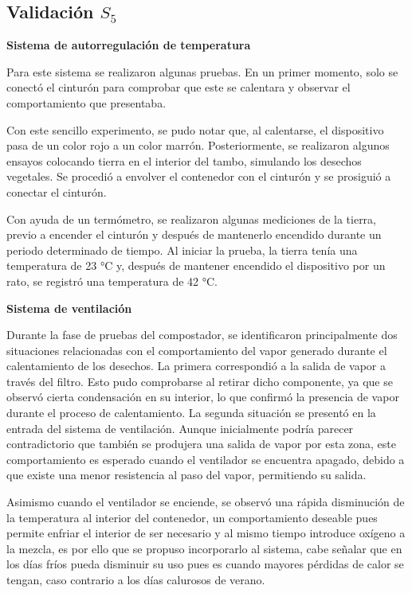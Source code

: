 \subsection{Validación  $S_5$}

\textbf{Sistema de autorregulación de temperatura
}

Para este sistema se realizaron algunas pruebas. En un primer momento, solo se conectó el cinturón para comprobar que este se calentara y observar el comportamiento que presentaba.

Con este sencillo experimento, se pudo notar que, al calentarse, el dispositivo pasa de un color rojo a un color marrón. Posteriormente, se realizaron algunos ensayos colocando tierra en el interior del tambo, simulando los desechos vegetales. Se procedió a envolver el contenedor con el cinturón y se prosiguió a conectar el cinturón.

Con ayuda de un termómetro, se realizaron algunas mediciones de la tierra, previo a encender el cinturón y después de mantenerlo encendido durante un periodo determinado de tiempo. Al iniciar la prueba, la tierra tenía una temperatura de 23 °C y, después de mantener encendido el dispositivo por un rato, se registró una temperatura de 42 °C.

\textbf{Sistema de ventilación}

Durante la fase de pruebas del compostador, se identificaron principalmente dos situaciones relacionadas con el comportamiento del vapor generado durante el calentamiento de los desechos. La primera correspondió a la salida de vapor a través del filtro. Esto pudo comprobarse al retirar dicho componente, ya que se observó cierta condensación en su interior, lo que confirmó la presencia de vapor durante el proceso de calentamiento.
La segunda situación se presentó en la entrada del sistema de ventilación. Aunque inicialmente podría parecer contradictorio que también se produjera una salida de vapor por esta zona, este comportamiento es esperado cuando el ventilador se encuentra apagado, debido a que existe una menor resistencia al paso del vapor, permitiendo su salida.

Asimismo cuando el ventilador se enciende, se observó una rápida disminución de la temperatura al interior del contenedor, un comportamiento deseable pues permite enfriar el interior de ser necesario y al mismo tiempo introduce oxígeno a la mezcla, es por ello que se propuso incorporarlo al sistema, cabe señalar que en los días fríos pueda disminuir su uso pues es cuando mayores pérdidas de calor se tengan, caso contrario a los días calurosos de verano.

\newpage